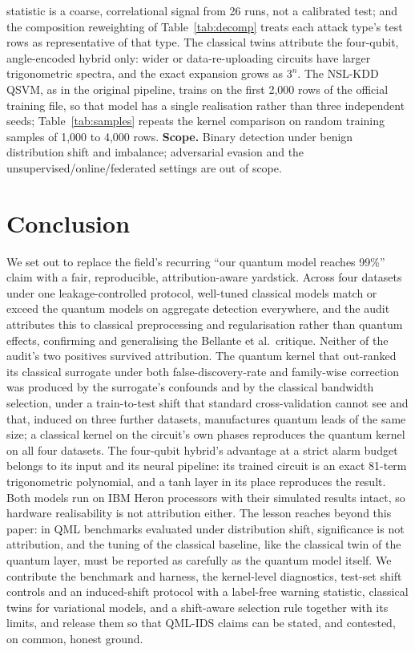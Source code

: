 \documentclass[preprint,11pt]{elsarticle}
\begin{document}
statistic is a coarse, correlational signal from 26 runs, not a calibrated test; and the composition
reweighting of Table~\ref{tab:decomp} treats each attack type's test rows as representative of that type.
The classical twins attribute the four-qubit, angle-encoded hybrid only: wider or data-re-uploading
circuits have larger trigonometric spectra, and the exact expansion grows as $3^n$. The NSL-KDD QSVM, as in the original pipeline, trains on the first 2{,}000 rows of the
official training file, so that model has a single realisation rather than three independent seeds; Table~\ref{tab:samples}
repeats the kernel comparison on random training samples of 1{,}000 to 4{,}000 rows.
\textbf{Scope.} Binary detection under benign distribution shift and imbalance; adversarial evasion and the
unsupervised/online/federated settings are out of scope.

\section{Conclusion}

We set out to replace the field's recurring ``our quantum model reaches 99\%'' claim with a fair,
reproducible, attribution-aware yardstick. Across four datasets under one leakage-controlled protocol,
well-tuned classical models match or exceed the quantum models on aggregate detection everywhere, and the
audit attributes this to classical preprocessing and regularisation rather than quantum effects,
confirming and generalising the Bellante et al.\ critique. Neither of the audit's two positives survived attribution. The quantum kernel that out-ranked its
classical surrogate under both false-discovery-rate and family-wise correction was produced by the
surrogate's confounds and by the classical bandwidth selection, under a train-to-test shift that standard
cross-validation cannot see and that, induced on three further datasets, manufactures quantum leads of
the same size; a classical kernel on the circuit's own phases reproduces the quantum kernel on all four
datasets. The four-qubit hybrid's advantage at a strict alarm budget belongs to its input and its neural
pipeline: its trained circuit is an exact 81-term trigonometric polynomial, and a tanh layer in its place
reproduces the result. Both models run on IBM Heron processors with their simulated results intact, so
hardware realisability is not attribution either. The lesson reaches beyond this paper: in QML
benchmarks evaluated under distribution shift, significance is not attribution, and the tuning of the
classical baseline, like the classical twin of the quantum layer, must be reported as carefully as the
quantum model itself. We contribute the benchmark and harness, the kernel-level diagnostics, test-set
shift controls and an induced-shift protocol with a label-free warning statistic, classical twins for
variational models, and a shift-aware selection rule together with its limits, and release them so that
QML-IDS claims can be stated, and contested, on common, honest ground.
\end{document}
